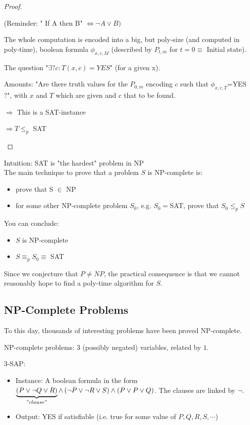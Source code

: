 \begin{proof}
\begin{itemize}
(Reminder: " If A then B" $\Leftrightarrow \neg A \vee B)$ 

The whole computation is encoded into a big, but poly-size (and computed in poly-time), boolean formula $\phi_{x,c,M}$ (described by $P_{t,m}$ for $t=0\equiv$ Initial state). 

The question "$\exists ? c: T(x,c)=YES$" (for a given x). 

Amounts: "Are there truth values for the $P_{0,m}$ encoding $c$ such that $\phi_{x,c,T}$=YES ?", with $x$ and $T$ which are given and $c$ that to be found. 

$\Rightarrow$ This is a SAT-instance 

$\Rightarrow T \leq_{p} $ SAT
\end{itemize} 
\end{proof}

Intuition: SAT is "the hardest" problem in NP \\
The main technique to prove that a problem $S$ is NP-complete is:
\begin{itemize}
\item prove that S $\in$ NP
\item for some other NP-complete problem $S_0$, e.g. $S_0=$SAT, prove that $S_0 \leq_p S$
\end{itemize}
You can conclude:
\begin{itemize}
\item $S$ is NP-complete
\item $S \equiv_p S_0 \equiv$ SAT
\end{itemize}
Since we conjecture that $P\neq NP$, the practical consequence is that we cannot reasonably hope to find a poly-time algorithm for $S$. 
 
\subsection{NP-Complete Problems}

To this day, thousands of interesting problems have been proved NP-complete.

\begin{example}
\begin{leftbar}
NP-complete problems: $3$ (possibly negated) variables, related by $1$.
\begin{definition}
3-SAP:
\begin{itemize}
\item Instance: A boolean formula in the form $\underbrace{\left( P \vee \neg Q \vee R \right)}_{"clause"} \wedge \left( \neg P \vee \neg R \vee S \right) \wedge \left( P \vee P  \vee Q \right)$. The clauses are linked by $\neg$.
\item Output: YES if satisfiable (i.e. true for some value of $P,Q,R,S,\cdots$) 
\end{itemize}
\end{definition}
\end{leftbar}
\end{example}

